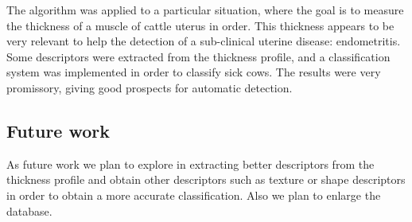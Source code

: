 \documentclass{article}
\begin{document}
The algorithm was applied to a particular situation, where the goal is
to measure the thickness of a muscle of cattle uterus in order. This
thickness appears to be very relevant to help the detection of a
sub-clinical uterine disease: endometritis. Some descriptors were
extracted from the thickness profile, and a classification system was
implemented in order to classify sick cows. The results were very
promissory, giving good prospects for automatic detection.

\subsection{Future work}
\label{ssec:future}
As future work we plan to explore in extracting better descriptors
from the thickness profile and obtain other descriptors such as
texture or shape descriptors in order to obtain a more accurate
classification. Also we plan to enlarge the database.



\end{document}
